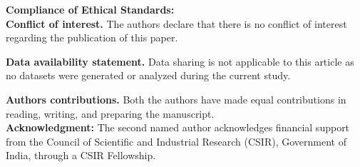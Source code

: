 \documentclass[a4paper,12pt,reqno]{amsart} %
\numberwithin{equation}{section}
\theoremstyle{definition}
\begin{document}
\noindent\textbf{Compliance of Ethical Standards:}\\

\noindent\textbf{Conflict of interest.} The authors declare that there is no conflict  of interest regarding the publication of this paper.
\vspace{1.5mm}

\noindent\textbf{Data availability statement.}  Data sharing is not applicable to this article as no datasets were generated or analyzed during the current study.
\vspace{1.5mm}

\noindent\textbf{Authors contributions.} Both the authors have made equal contributions in reading, writing, and preparing the manuscript.\\

\noindent\textbf{Acknowledgment:} 
The second named author acknowledges financial support from the Council of Scientific and Industrial Research (CSIR), Government of India, through a CSIR Fellowship.
\end{document}
